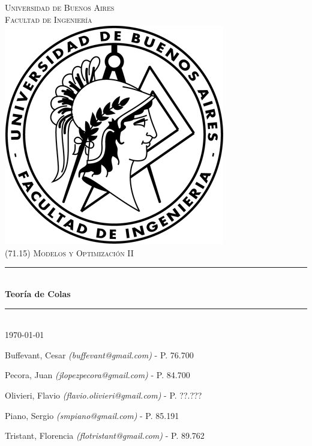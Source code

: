 \documentclass[a4paper,11pt]{article}
\begin{document}
\thispagestyle{empty}

\begin{titlepage}

\newcommand{\HRule}{\rule{\linewidth}{0.5mm}}
\newenvironment{bottompar}{\par\vspace*{\fill}}{\clearpage}

\center

\textsc{\LARGE Universidad de Buenos Aires}\\[0.5cm]
\textsc{\Large Facultad de Ingeniería}\\[1.5cm]

\includegraphics[scale=0.5]{../logo.png}\\[1cm]


\textsc{\large (71.15) Modelos y Optimización II}\\[0.25cm]
\HRule \\[0.4cm]
{\huge \bfseries Teoría de Colas}\\[0.4cm]
\HRule \\[0.5cm]

{\large \today}

\begin{bottompar}
\flushleft
Buffevant, Cesar \textit{(buffevant@gmail.com)}         - P. 76.700

Pecora, Juan \textit{(jlopezpecora@gmail.com)}          - P. 84.700

Olivieri, Flavio \textit{(flavio.olivieri@gmail.com)}   - P. ??.???

Piano, Sergio \textit{(smpiano@gmail.com)}              - P. 85.191

Tristant, Florencia \textit{(flotristant@gmail.com)}    - P. 89.762
\end{bottompar}

\end{titlepage}
\end{document}
